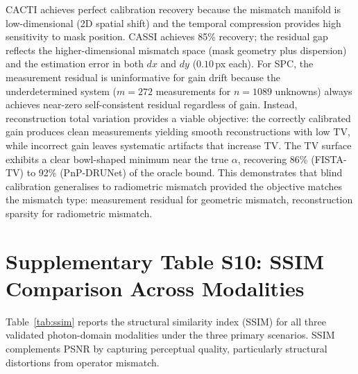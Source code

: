 \documentclass[11pt]{article}
\begin{document}
\noindent CACTI achieves perfect calibration recovery because the mismatch
manifold is low-dimensional (2D spatial shift) and the temporal compression
provides high sensitivity to mask position.  CASSI achieves 85\% recovery;
the residual gap reflects the higher-dimensional mismatch space (mask
geometry plus dispersion) and the estimation error in both $dx$ and $dy$
($0.10$\,px each).  For SPC, the measurement residual is uninformative
for gain drift because the underdetermined system ($m{=}272$ measurements
for $n{=}1089$ unknowns) always achieves near-zero self-consistent residual
regardless of gain.  Instead, reconstruction total variation provides a
viable objective: the correctly calibrated gain produces clean measurements
yielding smooth reconstructions with low TV, while incorrect gain leaves
systematic artifacts that increase TV.  The TV surface exhibits a clear
bowl-shaped minimum near the true $\alpha$, recovering 86\% (FISTA-TV) to
92\% (PnP-DRUNet) of the oracle bound.  This demonstrates that blind
calibration generalises to radiometric mismatch provided the objective
matches the mismatch type: measurement residual for geometric mismatch,
reconstruction sparsity for radiometric mismatch.


\newpage
\section{Supplementary Table S10: SSIM Comparison Across Modalities}
\label{sec:ssim}

Table~\ref{tab:ssim} reports the structural similarity index (SSIM)
for all three validated photon-domain modalities under the three
primary scenarios. SSIM complements PSNR by capturing perceptual
quality, particularly structural distortions from operator mismatch.
\end{document}
